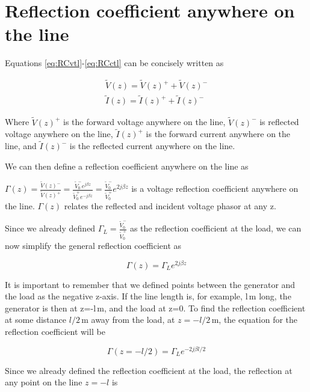 \documentclass{ximera}
\begin{document}
\section{Reflection coefficient anywhere on the line}

Equations \ref{eq:RCvtl}-\ref{eq:RCctl}  can be concisely written as 

\begin{eqnarray}
\tilde{V}(z) =\tilde{V}(z)^+ + \tilde{V}(z)^- \\
\tilde{I}(z) =\tilde{I}(z)^+ + \tilde{I}(z)^- 
\end{eqnarray}

Where $\tilde{V}(z)^+$ is the forward voltage anywhere on the line, $\tilde{V}(z)^-$ is reflected voltage anywhere on the line, $\tilde{I}(z)^+$ is the forward current anywhere on the line, and  $\tilde{I}(z)^-$ is the reflected current anywhere on the line.

We can then define a reflection coefficient anywhere on the line as

\begin{definition}
$\Gamma(z)=\frac{\tilde{V}(z)^-}{\tilde{V}(z)^+} = \frac{\tilde{V}_0^- e^{j \beta z}}{\tilde{V}_0^+ e^{-j \beta z}} = \frac{\tilde{V}_0^-}{\tilde{V}_0^+} e^{2j \beta z} $ is a voltage reflection coefficient anywhere on the line. $\Gamma(z)$ relates the reflected and incident voltage
phasor at any z. 

Since we already defined $\Gamma_L=\frac{\tilde{V}_0^-}{\tilde{V}_0^+}$ as the reflection coefficient at the load, we can now simplify the general reflection coefficient as 

\begin{equation}
\Gamma(z)=\Gamma_L e^{2j \beta z}
\end{equation}

It is important to remember that we defined points between the generator and the load as the negative z-axis. If the line length is, for example, l\,m long, the generator is then at z=-l\,m, and the load at z=0. To find the reflection coefficient at some distance $l/2$\,m away from the load,  at $z=-l/2$\,m, the equation for the reflection coefficient will be


\begin{equation}
\Gamma(z=-l/2)=\Gamma_L e^{-2j \beta l/2}
\end{equation}

\end{definition}

Since we already defined the reflection coefficient at the load, the reflection at any point on the line $z=-l$ is
\end{document}
